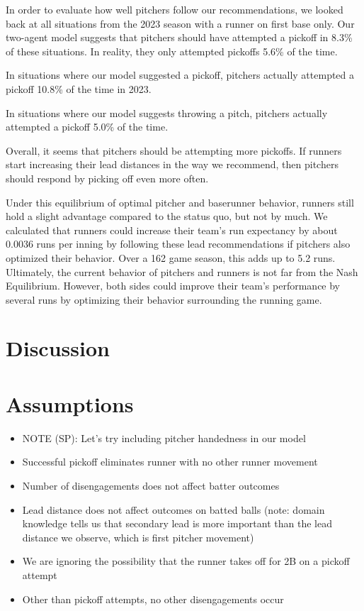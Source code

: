 \documentclass{article}
\begin{document}
        In order to evaluate how well pitchers follow our recommendations, we looked back at all situations from the 2023 season with a runner on first base only. Our two-agent model suggests that pitchers should have attempted a pickoff in 8.3\% of these situations. In reality, they only attempted pickoffs 5.6\% of the time.

        In situations where our model suggested a pickoff, pitchers actually attempted a pickoff 10.8\% of the time in 2023.

        In situations where our model suggests throwing a pitch, pitchers actually attempted a pickoff 5.0\% of the time.

        Overall, it seems that pitchers should be attempting more pickoffs. If runners start increasing their lead distances in the way we recommend, then pitchers should respond by picking off even more often.

        Under this equilibrium of optimal pitcher and baserunner behavior, runners still hold a slight advantage compared to the status quo, but not by much. We calculated that runners could increase their team's run expectancy by about 0.0036 runs per inning by following these lead recommendations if pitchers also optimized their behavior. Over a 162 game season, this adds up to 5.2 runs. Ultimately, the current behavior of pitchers and runners is not far from the Nash Equilibrium. However, both sides could improve their team's performance by several runs by optimizing their behavior surrounding the running game.

  \section{Discussion}

  \section{Assumptions}

    \begin{itemize}
      \item NOTE (SP): Let's try including pitcher handedness in our model
      \item Successful pickoff eliminates runner with no other runner movement
      \item Number of disengagements does not affect batter outcomes
      \item Lead distance does not affect outcomes on batted balls (note: domain knowledge tells us that secondary lead is more important than the lead distance we observe, which is first pitcher movement)
      \item We are ignoring the possibility that the runner takes off for 2B on a pickoff attempt
      \item Other than pickoff attempts, no other disengagements occur
    \end{itemize}

  
\end{document}
